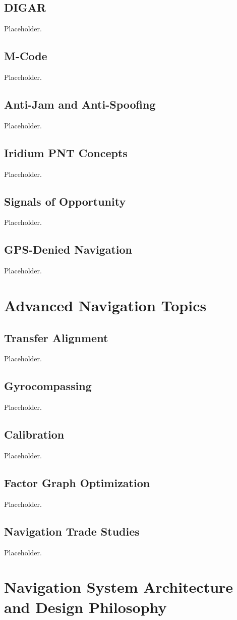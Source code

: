 \documentclass[11pt,oneside]{book}
\begin{document}
\section{DIGAR}
Placeholder.
\section{M-Code}
Placeholder.
\section{Anti-Jam and Anti-Spoofing}
Placeholder.
\section{Iridium PNT Concepts}
Placeholder.
\section{Signals of Opportunity}
Placeholder.
\section{GPS-Denied Navigation}
Placeholder.

\chapter{Advanced Navigation Topics}
\section{Transfer Alignment}
Placeholder.
\section{Gyrocompassing}
Placeholder.
\section{Calibration}
Placeholder.
\section{Factor Graph Optimization}
Placeholder.
\section{Navigation Trade Studies}
Placeholder.

\chapter{Navigation System Architecture and Design Philosophy}
\end{document}
